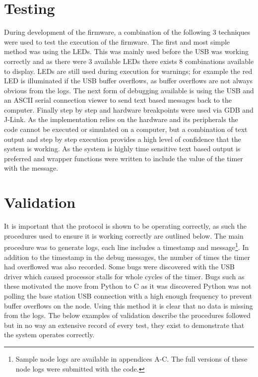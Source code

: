 \documentclass[parskip]{cs4rep}
\begin{document}
\section{Testing}

During development of the firmware, a combination of the following 3 techniques were used to test the execution of the firmware. The first and most simple method was using the LEDs. This was mainly used before the USB was working correctly and as there were 3 available LEDs there exists 8 combinations available to display. LEDs are still used during execution for warnings; for example the red LED is illuminated if the USB buffer overflows, as buffer overflows are not always obvious from the logs. The next form of debugging available is using the USB and an ASCII serial connection viewer to send text based messages back to the computer. Finally step by step and hardware breakpoints were used via GDB and J-Link. As the implementation relies on the hardware and its peripherals the code cannot be executed or simulated on a computer, but a combination of text output and step by step execution provides a high level of confidence that the system is working. As the system is highly time sensitive text based output is preferred and wrapper functions were written to include the value of the timer with the message. 

\section{Validation}

It is important that the protocol is shown to be operating correctly, as such the procedures used to ensure it is working correctly are outlined below. The main procedure was to generate logs, each line includes a timestamp and message\footnote{Sample node logs are available in appendices A-C. The full versions of these node logs were submitted with the code.}. In addition to the timestamp in the debug messages, the number of times the timer had overflowed was also recorded. Some bugs were discovered with the USB driver which caused processor stalls for whole cycles of the timer. Bugs such as these motivated the move from Python to C as it was discovered Python was not polling the base station USB connection with a high enough frequency to prevent buffer overflows on the node. Using this method it is clear that no data is missing from the logs. The below examples of validation describe the procedures followed but in no way an extensive record of every test, they exist to demonstrate that the system operates correctly. 
\end{document}
